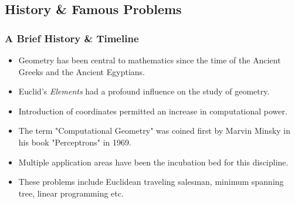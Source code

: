 \documentclass{beamer}
\begin{document}
\subsection{History \& Famous Problems}
\begin{frame}
  \frametitle{A Brief History \& Timeline}
  \begin{itemize}
      \item Geometry has been central to mathematics since the time of the Ancient Greeks and the Ancient Egyptians. 
      \item Euclid's \textit{Elements} had a profound influence on the study of geometry. 
      \item Introduction of coordinates permitted an increase in computational power. 
      \item The term "Computational Geometry" was coined first by Marvin Minsky in 
      his book "Perceptrons" in 1969. 
      \item Multiple application areas have been the incubation bed for this discipline. 
      \item These problems include Euclidean traveling salesman, minimum spanning tree, linear programming etc. 
  \end{itemize}
\end{frame}
\end{document}
